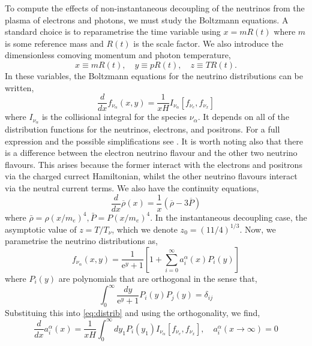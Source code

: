 \documentclass[11pt]{article}
\numberwithin{equation}{section}
\numberwithin{figure}{section}
\numberwithin{table}{section}
\begin{document}
To compute the effects of non-instantaneous decoupling of the neutrinos from the plasma of electrons and photons, we must study the Boltzmann equations. A standard choice is to reparametrise the time variable using $x = m R(t)$ where $m$ is some reference mass and $R(t)$ is the scale factor. We also introduce the dimensionless comoving momentum and photon temperature,
\begin{equation}
x \equiv m R(t), \quad y \equiv p R(t), \quad z \equiv T R(t).
\end{equation}
In these variables, the Boltzmann equations for the neutrino distributions can be written,
\begin{equation} \label{eq:distrib}
\frac{d}{d x} f_{\nu_{\alpha}}(x, y)=\frac{1}{x H} I_{\nu_{\alpha}}\left[f_{\nu_{e}}, f_{\nu_{x}}\right]
\end{equation}
where $I_{\nu_\alpha}$ is the collisional integral for the species $\nu_\alpha$. It depends on all of the distribution functions for the neutrinos, electrons, and positrons. For a full expression and the possible simplifications see \citet{Dolgov:1997mb}. It is worth noting also that there is a difference between the electron neutrino flavour and the other two neutrino flavours. This arises because the former interact with the electrons and positrons via the charged currect Hamiltonian, whilst the other neutrino flavours interact via the neutral current terms. We also have the continuity equations,
\begin{equation}
\frac{d}{d x} \overline{\rho}(x)=\frac{1}{x}(\overline{\rho}-3 \overline{P})
\end{equation}
where $\bar{\rho} = \rho(x/m_e)^4, \bar{P} = P(x/m_e)^4$. In the instantaneous decoupling case, the asymptotic value of $z = T/T_\nu$, which we denote $z_0 = (11/4)^{1/3}$. Now, we parametrise the neutrino distributions as,
\begin{equation}
f_{\nu_{\alpha}}(x, y)=\frac{1}{\mathrm{e}^{y}+1}\left[1+\sum_{i=0}^{\infty} a_{i}^{\alpha}(x) P_{i}(y)\right]
\end{equation}
where $P_i(y)$ are polynomials that are orthogonal in the sense that,
\begin{equation}
\int_{0}^{\infty} \frac{d y}{\mathrm{e}^{y}+1} P_{i}(y) P_{j}(y)=\delta_{i j}
\end{equation}
Substituing this into \eqref{eq:distrib} and using the orthogonality, we find,
\begin{equation}
\frac{d}{d x} a_{i}^{\alpha}(x)=\frac{1}{x H} \int_{0}^{\infty} d y_{1} P_{i}\left(y_{1}\right) I_{\nu_{\alpha}}\left[f_{\nu_{e}}, f_{\nu_{x}}\right], \quad a_i^{\alpha}(x \rightarrow \infty) = 0
\end{equation}
\end{document}
